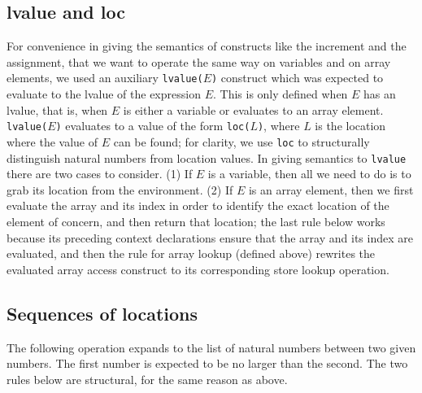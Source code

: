 \documentclass{article}
\begin{document}
\begin{kdefinition}
\begin{module}{}
\begin{kblock}[text]
 \subsection{lvalue and loc}
For convenience in giving the semantics of constructs like the increment and
the assignment, that we want to operate the same way on variables and on
array elements, we used an auxiliary \texttt{lvalue($E$)} construct which was
expected to evaluate to the lvalue of the expression $E$.  This is only
defined when $E$ has an lvalue, that is, when $E$ is either a variable or
evaluates to an array element.  \texttt{lvalue($E$)} evaluates to a value of
the form \texttt{loc($L$)}, where $L$ is the location where the value of $E$
can be found; for clarity, we use \texttt{loc} to structurally distinguish
natural numbers from location values.  In giving semantics to \texttt{lvalue}
there are two cases to consider.  (1) If $E$ is a variable, then all we need
to do is to grab its location from the environment.  (2) If $E$ is an array
element, then we first evaluate the array and its index in order to identify
the exact location of the element of concern, and then return that location;
the last rule below works because its preceding context declarations ensure
that the array and its index are evaluated, and then the rule for array lookup
(defined above) rewrites the evaluated array access construct to its
corresponding store lookup operation. \end{kblock}

\begin{syntaxBlock}{}
\end{syntaxBlock}

\begin{syntaxBlock}{}
\end{syntaxBlock}
\begin{kblock}[text]
 \subsection{Sequences of locations}
The following operation expands to the list of natural numbers between two
given numbers.  The first number is expected to be no larger than the second.
The two rules below are structural, for the same reason as above. \end{kblock}


\end{module}
\end{kdefinition}
\end{document}
